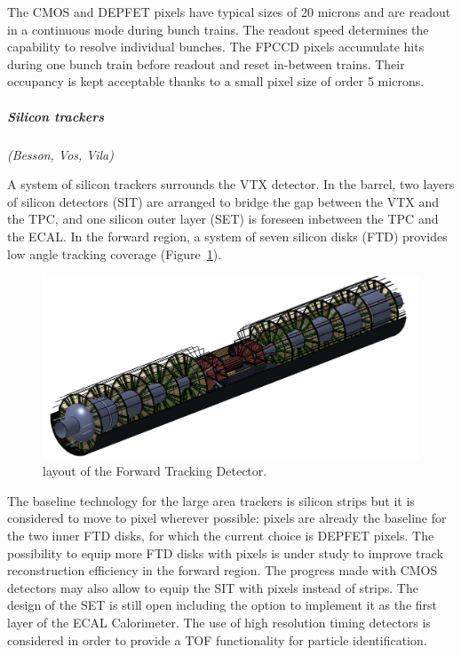 \vspace{0.5cm}
The CMOS and DEPFET pixels have typical sizes of 20 microns and are readout in a continuous mode during bunch trains. The readout speed determines the capability to resolve individual bunches. The FPCCD pixels accumulate hits during one bunch train before readout and reset in-between trains. Their occupancy is kept acceptable thanks to a small pixel size of order 5 microns.  


\vspace{1cm}
\subparagraph*{\bf Silicon trackers}
\textit{(Besson, Vos, Vila)}

A system of silicon trackers surrounds the VTX detector. In the barrel, two layers of silicon detectors (SIT) are arranged to bridge the gap between the VTX and the TPC, and one silicon outer layer (SET) is foreseen inbetween the TPC and the ECAL. In the forward region, a system of seven silicon disks (FTD) provides low angle tracking coverage (Figure~\ref{fig:det:FTD}).

\begin{figure}[t!]
\centering
\includegraphics[width=0.75\hsize]{Detector/fig/FTD.png}
\caption{layout of the Forward Tracking Detector.}
\label{fig:det:FTD}
\end{figure}

The baseline technology for the large area trackers is silicon strips but it is considered to move to pixel wherever possible: pixels are already the baseline for the two inner FTD disks, for which the current choice is DEPFET pixels. The possibility to equip more FTD disks with pixels is under study to improve track reconstruction efficiency in the forward region. The progress made with CMOS detectors may also allow to equip the SIT with pixels instead of strips. The design of the SET is still open including the option to implement it as the first layer of the ECAL Calorimeter. The use of high resolution timing detectors is considered in order to provide a TOF functionality for particle identification.   

